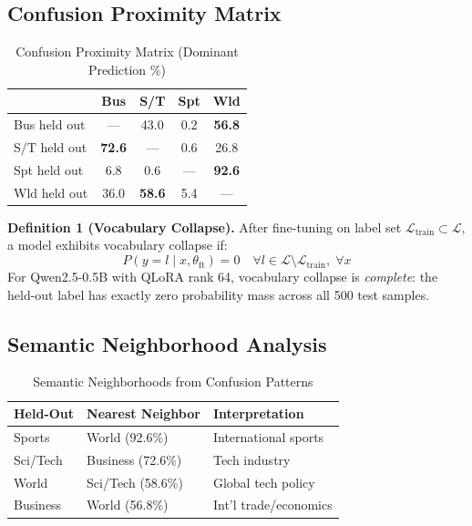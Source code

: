 \documentclass[journal]{IEEEtran}
\begin{document}
\subsection{Confusion Proximity Matrix}

\begin{table}[!ht]
\centering\caption{Confusion Proximity Matrix (Dominant Prediction \%)}
\label{tab:proximity}
\begin{tabular}{lcccc}
\toprule
& \textbf{Bus} & \textbf{S/T} & \textbf{Spt} & \textbf{Wld} \\
\midrule
Bus held out & --- & 43.0 & 0.2 & \textbf{56.8} \\
S/T held out & \textbf{72.6} & --- & 0.6 & 26.8 \\
Spt held out & 6.8 & 0.6 & --- & \textbf{92.6} \\
Wld held out & 36.0 & \textbf{58.6} & 5.4 & --- \\
\bottomrule
\end{tabular}
\end{table}

\noindent\textbf{Definition 1 (Vocabulary Collapse).} After fine-tuning on label set $\mathcal{L}_\text{train} \subset \mathcal{L}$, a model exhibits vocabulary collapse if:
\begin{equation}
P(y = l \mid x, \theta_\text{ft}) = 0 \quad \forall l \in \mathcal{L} \setminus \mathcal{L}_\text{train}, \; \forall x
\end{equation}
For Qwen2.5-0.5B with QLoRA rank 64, vocabulary collapse is \emph{complete}: the held-out label has exactly zero probability mass across all 500 test samples.

\subsection{Semantic Neighborhood Analysis}

\begin{table}[!ht]
\centering\caption{Semantic Neighborhoods from Confusion Patterns}
\label{tab:semantic}
\begin{tabular}{lll}
\toprule
\textbf{Held-Out} & \textbf{Nearest Neighbor} & \textbf{Interpretation} \\
\midrule
Sports & World (92.6\%) & International sports \\
Sci/Tech & Business (72.6\%) & Tech industry \\
World & Sci/Tech (58.6\%) & Global tech policy \\
Business & World (56.8\%) & Int'l trade/economics \\
\bottomrule
\end{tabular}
\end{table}
\end{document}
